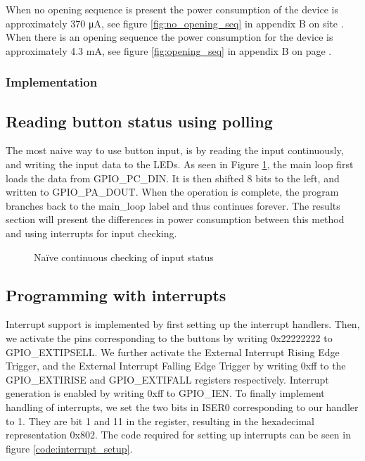 When no opening sequence is present the power consumption of the device is approximately 370 \si{\micro\ampere}, see figure \ref{fig:no_opening_seq} in appendix B on site \pageref{fig:no_opening_seq}. When there is an opening sequence the power consumption for the device is approximately 4.3 \si{\milli\ampere}, see figure \ref{fig:opening_seq} in appendix B on page \pageref{fig:opening_seq}.

\subsubsection{Implementation}

\subsection{Reading button status using polling}
\label{subsec:polling}

The most naive way to use button input, is by reading the input continuously, and writing the input data to the LEDs.
As seen in Figure \ref{code:polling}, the main loop first loads the data from GPIO\_PC\_DIN.
It is then shifted 8 bits to the left, and written to GPIO\_PA\_DOUT.
When the operation is complete, the program branches back to the main\_loop label and thus continues forever.
The results section will present the differences in power consumption between this method and using interrupts for input checking.

\begin{figure}[h!]
\caption{Naïve continuous checking of input status}
\label{code:polling}
\end{figure}

\subsection{Programming with interrupts}
\label{subsec:dev_pros_interrupts}

Interrupt support is implemented by first setting up the interrupt handlers.
Then, we activate the pins corresponding to the buttons by writing 0x22222222 to GPIO\_EXTIPSELL.
We further activate the External Interrupt Rising Edge Trigger, and the External Interrupt Falling Edge Trigger by writing 0xff to the GPIO\_EXTIRISE and GPIO\_EXTIFALL registers respectively.
Interrupt generation is enabled by writing 0xff to GPIO\_IEN.
To finally implement handling of interrupts, we set the two bits in ISER0 corresponding to our handler to 1. They are bit 1 and 11 in the register, resulting in the hexadecimal representation 0x802.
The code required for setting up interrupts can be seen in figure \ref{code:interrupt_setup}.

